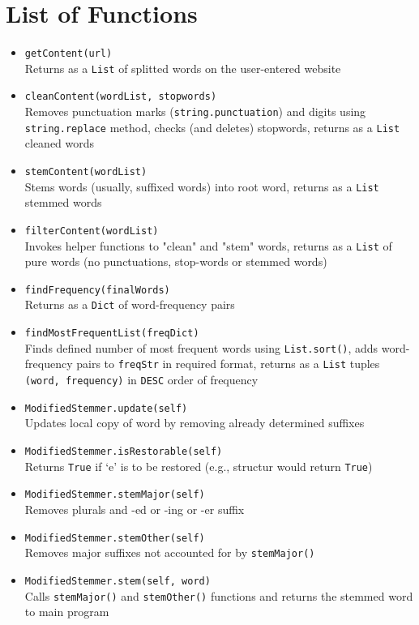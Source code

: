 \documentclass[12pt,letterpaper]{article}
\begin{document}
\section*{List of Functions}
\vspace{-2mm}
\begin{itemize}
    \item \texttt{getContent(url)} \\
        Returns as a \texttt{List} of splitted words on the user-entered website
    \item \texttt{cleanContent(wordList, stopwords)} \\
        Removes punctuation marks (\texttt{string.punctuation}) and digits using \texttt{string.replace} method, checks (and deletes) stopwords, returns as a \texttt{List} cleaned words
    \item \texttt{stemContent(wordList)} \\
        Stems words (usually, suffixed words) into root word, returns as a \texttt{List} stemmed words
    \item \texttt{filterContent(wordList)} \\
        Invokes helper functions to "clean" and "stem" words, returns as a \texttt{List} of pure words (no punctuations, stop-words or stemmed words)
    \item \texttt{findFrequency(finalWords)} \\
        Returns as a \texttt{Dict} of word-frequency pairs
    \item \texttt{findMostFrequentList(freqDict)} \\
        Finds defined number of most frequent words using \texttt{List.sort()}, adds word-frequency pairs to \texttt{freqStr} in required format, returns as a \texttt{List} tuples \texttt{(word, frequency)} in \texttt{DESC} order of frequency
    \item \texttt{ModifiedStemmer.update(self)} \\
        Updates local copy of word by removing already determined suffixes
    \item \texttt{ModifiedStemmer.isRestorable(self)} \\
        Returns \texttt{True} if `e' is to be restored (e.g., structur would return \texttt{True})
    \item \texttt{ModifiedStemmer.stemMajor(self)} \\
        Removes plurals and -ed or -ing or -er suffix
    \item \texttt{ModifiedStemmer.stemOther(self)} \\
        Removes major suffixes not accounted for by \texttt{stemMajor()}
    \item \texttt{ModifiedStemmer.stem(self, word)} \\
        Calls \texttt{stemMajor()} and \texttt{stemOther()} functions and returns the stemmed word to main program
\end{itemize}
\end{document}
